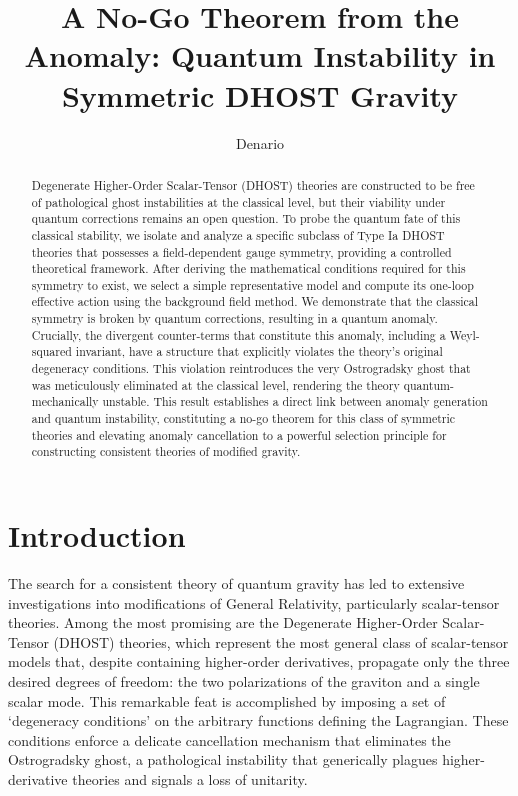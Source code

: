 \documentclass[twocolumn]{aastex631}
\begin{document}
\title{A No-Go Theorem from the Anomaly: Quantum Instability in Symmetric DHOST Gravity}

\author{Denario}

\begin{abstract}
Degenerate Higher-Order Scalar-Tensor (DHOST) theories are constructed to be free of pathological ghost instabilities at the classical level, but their viability under quantum corrections remains an open question. To probe the quantum fate of this classical stability, we isolate and analyze a specific subclass of Type Ia DHOST theories that possesses a field-dependent gauge symmetry, providing a controlled theoretical framework. After deriving the mathematical conditions required for this symmetry to exist, we select a simple representative model and compute its one-loop effective action using the background field method. We demonstrate that the classical symmetry is broken by quantum corrections, resulting in a quantum anomaly. Crucially, the divergent counter-terms that constitute this anomaly, including a Weyl-squared invariant, have a structure that explicitly violates the theory's original degeneracy conditions. This violation reintroduces the very Ostrogradsky ghost that was meticulously eliminated at the classical level, rendering the theory quantum-mechanically unstable. This result establishes a direct link between anomaly generation and quantum instability, constituting a no-go theorem for this class of symmetric theories and elevating anomaly cancellation to a powerful selection principle for constructing consistent theories of modified gravity.
\end{abstract}



\section{Introduction}
\label{sec:intro}
The search for a consistent theory of quantum gravity has led to extensive investigations into modifications of General Relativity, particularly scalar-tensor theories. Among the most promising are the Degenerate Higher-Order Scalar-Tensor (DHOST) theories, which represent the most general class of scalar-tensor models that, despite containing higher-order derivatives, propagate only the three desired degrees of freedom: the two polarizations of the graviton and a single scalar mode. This remarkable feat is accomplished by imposing a set of `degeneracy conditions' on the arbitrary functions defining the Lagrangian. These conditions enforce a delicate cancellation mechanism that eliminates the Ostrogradsky ghost, a pathological instability that generically plagues higher-derivative theories and signals a loss of unitarity.
\end{document}
